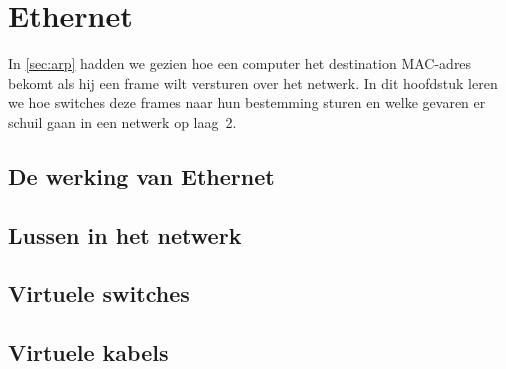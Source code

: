 \section{Ethernet}
\label{sec:ethernet}

In \vref{sec:arp} hadden we gezien hoe een computer het destination MAC-adres bekomt als hij een frame wilt versturen over het netwerk.
In dit hoofdstuk leren we hoe switches deze frames naar hun bestemming sturen en welke gevaren er schuil gaan in een netwerk op laag~2.

\subsection{De werking van Ethernet}

\subsection{Lussen in het netwerk}


\subsection{Virtuele switches}


\subsection{Virtuele kabels}

